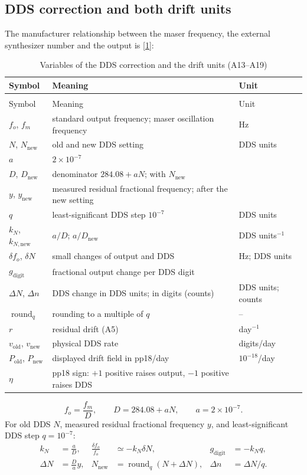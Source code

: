 \documentclass[11pt,a4paper]{article}
\makeatletter
\newcommand{\manual}{\href{https://www.gb.nrao.edu/~fghigo/timer/MSMmaser/Maser_UG_75666-201_Rev_J.PDF}{[1]}}
\renewcommand{\_}{\usscore\allowbreak}
\newenvironment{vartable}[2]{%
 \par\small\setlength{\LTpre}{3pt}\setlength{\LTpost}{3pt}%
 \begin{longtable}{@{}>{\raggedright}p{.2\linewidth}>{\raggedright}p{.57\linewidth}>{\raggedright\arraybackslash}p{.17\linewidth}@{}}
 \caption{#2}\label{#1}\\
 \toprule Symbol & Meaning & Unit\\\midrule
 \endfirsthead
 \multicolumn{3}{@{}l}{\footnotesize\itshape Table \thetable{} (continued)}\\
 \toprule Symbol & Meaning & Unit\\\midrule
 \endhead
 \bottomrule
 \endlastfoot}
 {\end{longtable}\normalsize}
\makeatother
\begin{document}
\subsection{DDS correction and both drift units}
The manufacturer relationship between the maser frequency, the external synthesizer number and the
output is \manual:
\begin{vartable}{tab:var-A3}{Variables of the DDS correction and the drift units (A13--A19)}
\(f_o\), \(f_m\) & standard output frequency; maser oscillation frequency & Hz\\
\(N\), \(N_{\mathrm{new}}\) & old and new DDS setting & DDS units\\
\(a\) & \(2\times10^{-7}\) & 1\\
\(D\), \(D_{\mathrm{new}}\) & denominator \(284.08+aN\); with \(N_{\mathrm{new}}\) & 1\\
\(y\), \(y_{\mathrm{new}}\) & measured residual fractional frequency; after the new setting & 1\\
\(q\) & least-significant DDS step \(10^{-7}\) & DDS units\\
\(k_N\), \(k_{N,\mathrm{new}}\) & \(a/D\); \(a/D_{\mathrm{new}}\) & DDS units\(^{-1}\)\\
\(\delta f_o\), \(\delta N\) & small changes of output and DDS & Hz; DDS units\\
\(g_{\mathrm{digit}}\) & fractional output change per DDS digit & 1\\
\(\Delta N\), \(\Delta n\) & DDS change in DDS units; in digits (counts) & DDS units; counts\\
\(\operatorname{round}_q\) & rounding to a multiple of \(q\) & --\\
\(r\) & residual drift (A5) & day\(^{-1}\)\\
\(v_{\mathrm{old}}\), \(v_{\mathrm{new}}\) & physical DDS rate & digits/day\\
\(P_{\mathrm{old}}\), \(P_{\mathrm{new}}\) & displayed drift field in pp18/day & \(10^{-18}\)/day\\
\(\eta\) & pp18 sign: \(+1\) positive raises output, \(-1\) positive raises DDS & 1\\
\end{vartable}
\begin{equation}
f_o=\frac{f_m}{D},\qquad D=284.08+aN,\qquad a=2\times10^{-7}. \tag{A13}\label{eq:A13}
\end{equation}
For old DDS \(N\), measured residual fractional frequency \(y\), and
least-significant DDS step \(q=10^{-7}\):
\begin{align}
k_N&=\frac{a}{D},&
\frac{\delta f_o}{f_o}&\simeq-k_N\delta N,&
g_{\mathrm{digit}}&=-k_Nq, \tag{A14}\label{eq:A14}\\
\Delta N&=\frac{D}{a}y,&
N_{\mathrm{new}}&=\operatorname{round}_{q}(N+\Delta N),&
\Delta n&=\Delta N/q. \tag{A15}\label{eq:A15}
\end{align}
\end{document}
